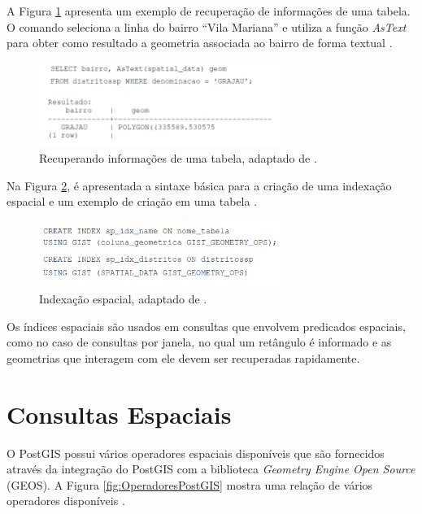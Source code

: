 A Figura \ref{fig:SelectPostGIS} apresenta um exemplo de recuperação de informações de uma tabela. O comando seleciona a linha do bairro “Vila Mariana” e utiliza a função \textit{AsText} para obter como resultado a geometria associada ao bairro de forma textual \cite{queirozferreira}.

\begin{figure}[h]
\centering
\includegraphics[width=0.70\textwidth]{./img/cap_II/14-SelectPostGIS}
\caption{Recuperando informações de uma tabela, adaptado de \cite{queirozferreira}.}
\label{fig:SelectPostGIS}
\end{figure}

\newpage

Na Figura \ref{fig:IndexPostGIS}, é apresentada a sintaxe básica para a criação de uma indexação espacial e um exemplo de criação em uma tabela \cite{queirozferreira}.

\begin{figure}[h]
\centering
\includegraphics[width=0.70\textwidth]{./img/cap_II/15-IndexPostGIS}
\caption{Indexação espacial, adaptado de \cite{queirozferreira}.}
\label{fig:IndexPostGIS}
\end{figure}

Os índices espaciais são usados em consultas que envolvem predicados espaciais, como no caso de consultas por janela, no qual um retângulo é informado e as geometrias que interagem com ele devem ser recuperadas rapidamente.

\section{Consultas Espaciais}

O PostGIS possui vários operadores espaciais disponíveis que são fornecidos através da integração do PostGIS com a biblioteca \textit{Geometry Engine Open Source} (GEOS). A Figura \ref{fig:OperadoresPostGIS} mostra uma relação de vários operadores disponíveis \cite{queirozferreira}.

